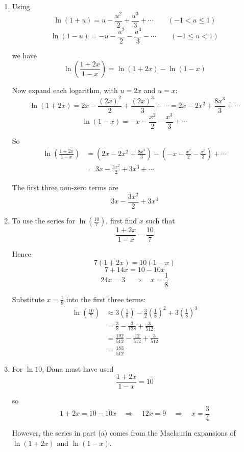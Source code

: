 \documentclass[leqno]{article}
\begin{document}
\begin{enumerate}[
  label=\textbf{\arabic*.},
  leftmargin=*,
  topsep=0pt,
  partopsep=0pt,
  parsep=0pt
]
\begin{djsSolution}
\begin{enumerate}[label=\textbf{(\alph*)}]
  \item Using
  \[
  \ln(1+u)=u-\frac{u^2}{2}+\frac{u^3}{3}+\cdots\qquad (-1<u\leq 1)
  \]
  \[
  \ln(1-u)=-u-\frac{u^2}{2}-\frac{u^3}{3}-\cdots\qquad (-1\leq u<1)
  \]

  we have
  \[
  \ln\left(\frac{1+2x}{1-x}\right)=\ln(1+2x)-\ln(1-x)
  \]

  Now expand each logarithm, with \(u=2x\) and \(u=x\):
  \[
  \ln(1+2x)=2x-\frac{(2x)^2}{2}+\frac{(2x)^3}{3}+\cdots
  =2x-2x^2+\frac{8x^3}{3}+\cdots
  \]
  \[
  \ln(1-x)=-x-\frac{x^2}{2}-\frac{x^3}{3}+\cdots
  \]

  So
  \begin{align*}
  \ln\left(\frac{1+2x}{1-x}\right)
  &=\left(2x-2x^2+\frac{8x^3}{3}\right)-\left(-x-\frac{x^2}{2}-\frac{x^3}{3}\right)+\cdots \\
  &=3x-\frac{3x^2}{2}+3x^3+\cdots
  \end{align*}

  The first three non-zero terms are
  \[
  3x-\frac{3x^2}{2}+3x^3
  \]

  \item To use the series for \(\ln\left(\frac{10}{7}\right)\), first find \(x\) such that
  \[
  \frac{1+2x}{1-x}=\frac{10}{7}
  \]

  Hence
  \[
  7(1+2x)=10(1-x)
  \]
  \[
  7+14x=10-10x
  \]
  \[
  24x=3\quad\Longrightarrow\quad x=\frac18
  \]

  Substitute \(x=\frac18\) into the first three terms:
  \begin{align*}
  \ln\left(\frac{10}{7}\right)
  &\approx 3\left(\frac18\right)-\frac32\left(\frac18\right)^2+3\left(\frac18\right)^3 \\
  &=\frac38-\frac{3}{128}+\frac{3}{512} \\
  &=\frac{192}{512}-\frac{12}{512}+\frac{3}{512} \\
  &=\frac{183}{512}
  \end{align*}

  \item For \(\ln 10\), Dana must have used
  \[
  \frac{1+2x}{1-x}=10
  \]

  so
  \[
  1+2x=10-10x\quad\Longrightarrow\quad 12x=9\quad\Longrightarrow\quad x=\frac34
  \]

  However, the series in part (a) comes from the Maclaurin expansions of \(\ln(1+2x)\) and \(\ln(1-x)\).


\end{enumerate}
\end{djsSolution}
\end{enumerate}
\end{document}
